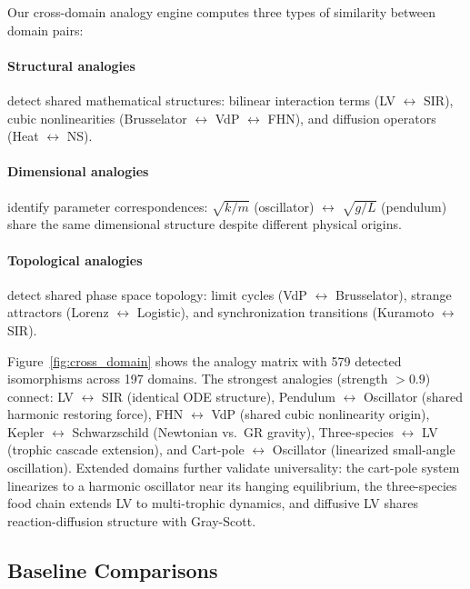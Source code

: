 \documentclass{article}
\begin{document}
Our cross-domain analogy engine computes three types of similarity between
domain pairs:

\paragraph{Structural analogies} detect shared mathematical structures:
bilinear interaction terms (LV $\leftrightarrow$ SIR), cubic nonlinearities
(Brusselator $\leftrightarrow$ VdP $\leftrightarrow$ FHN), and diffusion
operators (Heat $\leftrightarrow$ NS).

\paragraph{Dimensional analogies} identify parameter correspondences:
$\sqrt{k/m}$ (oscillator) $\leftrightarrow$ $\sqrt{g/L}$ (pendulum)
share the same dimensional structure despite different physical origins.

\paragraph{Topological analogies} detect shared phase space topology:
limit cycles (VdP $\leftrightarrow$ Brusselator), strange attractors
(Lorenz $\leftrightarrow$ Logistic), and synchronization transitions
(Kuramoto $\leftrightarrow$ SIR).

Figure~\ref{fig:cross_domain} shows the analogy matrix with 579 detected
isomorphisms across 197 domains. The strongest analogies (strength $> 0.9$)
connect: LV $\leftrightarrow$ SIR (identical ODE structure),
Pendulum $\leftrightarrow$ Oscillator (shared harmonic restoring force),
FHN $\leftrightarrow$ VdP (shared cubic nonlinearity origin),
Kepler $\leftrightarrow$ Schwarzschild (Newtonian vs.\ GR gravity),
Three-species $\leftrightarrow$ LV (trophic cascade extension),
and Cart-pole $\leftrightarrow$ Oscillator (linearized small-angle oscillation).
Extended domains further validate universality: the cart-pole system
linearizes to a harmonic oscillator near its hanging equilibrium,
the three-species food chain extends LV to multi-trophic dynamics,
and diffusive LV shares reaction-diffusion structure with Gray-Scott.

\subsection{Baseline Comparisons}
\label{sec:baselines}
\end{document}
